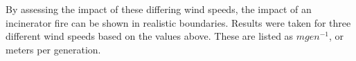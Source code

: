 \documentclass[11pt, a4paper, titlepage]{article}
\begin{document}
  By assessing the impact of these differing wind speeds, the impact of an incinerator fire can be shown in realistic boundaries. Results were taken for three different wind speeds based on the values above. These are listed as $mgen^{-1}$, or meters per generation.


  \begin{table}[h]
    \begin{center}



\end{center}
\end{table}
\end{document}
